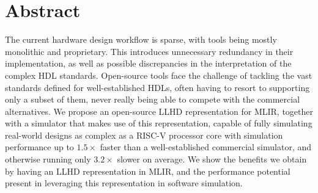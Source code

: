


\begingroup
\let\clearpage\relax
\let\cleardoublepage\relax
\let\cleardoublepage\relax

\chapter*{Abstract}
The current hardware design workflow is sparse, with tools being mostly monolithic and proprietary. This introduces unnecessary redundancy in their implementation, as well as possible discrepancies in the interpretation of the complex HDL standards.
Open-source tools face the challenge of tackling the vast standards defined for well-established HDLs, often having to resort to supporting only a subset of them, never really being able to compete with the commercial alternatives.
We propose an open-source LLHD representation for MLIR, together with a simulator that makes use of this representation, capable of fully simulating real-world designs as complex as a RISC-V processor core with simulation performance up to $1.5\times$ faster than a well-established commercial simulator, and otherwise running only $3.2\times$ slower on average.
We show the benefits we obtain by having an LLHD representation in MLIR, and the performance potential present in leveraging this representation in software simulation.

\endgroup

\vfill